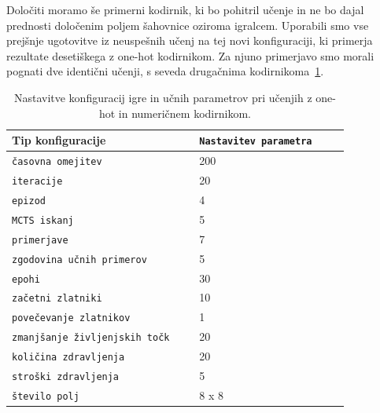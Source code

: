 \documentclass[a4paper, 12pt]{book}
\begin{document}
Določiti moramo še primerni kodirnik, ki bo pohitril učenje in ne bo dajal prednosti določenim poljem šahovnice oziroma igralcem.
Uporabili smo vse prejšnje ugotovitve iz neuspešnih učenj na tej novi konfiguraciji, ki primerja rezultate desetiškega z one-hot kodirnikom.
Za njuno primerjavo smo morali pognati dve identični učenji, s seveda drugačnima kodirnikoma~\ref{tableCompareOneHotNumeric}.

\begin{table}
	\begin{center}
		\begin{tabular}{p{0.5\linewidth}|p{0.4\linewidth}}
			Tip konfiguracije                          & {\tt Nastavitev parametra} \\ \hline
			{\tt časovna omejitev}                     & 200                        \\
			{\tt iteracije}                            & 20                         \\
			{\tt epizod}                               & 4                          \\
			{\tt MCTS iskanj}                          & 5                          \\
			{\tt primerjave}                           & 7                          \\
			{\tt zgodovina učnih primerov}             & 5                          \\
			{\tt epohi}                                & 30                         \\
			{\tt začetni zlatniki}                     & 10                         \\
			{\tt povečevanje zlatnikov}                & 1                          \\
			{\tt zmanjšanje življenjskih točk}         & 20                         \\
			{\tt količina zdravljenja}                 & 20                         \\
			{\tt stroški zdravljenja}                  & 5                          \\
			{\tt število polj}                         & 8 x 8                      \\	
		\end{tabular}
	\end{center}
	\caption{Nastavitve konfiguracij igre in učnih parametrov pri učenjih z one-hot in numeričnem kodirnikom.}
	\label{tableCompareOneHotNumeric}
\end{table}
\end{document}
